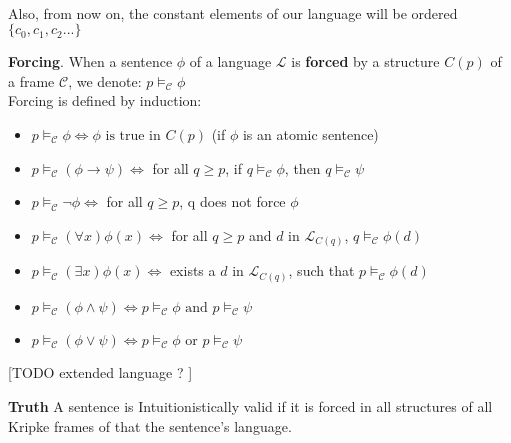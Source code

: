 \documentclass[runningheads]{llncs}
\begin{document}
    \\Also, from now on, the constant elements of our language will be ordered $\{c_0, c_1, c_2 ...\}$


\begin{definition}\textbf{Forcing}.
          When a sentence $\phi$ of a language $\mathcal{L}$ is \textbf{forced} by a structure $C(p)$ of a frame $\mathcal{C}$, we denote:
        $ p \vDash_{\mathcal{C}} \phi$ \\
         Forcing is defined by induction: \cite{book1}

        \begin{itemize}
            \item    $ p \vDash_{\mathcal{C}} \phi                 \Leftrightarrow \phi \text{ is true in } C(p)$ (if $\phi$ is an atomic sentence)\\
            \item    $ p \vDash_{\mathcal{C}} (\phi \to \psi)      \Leftrightarrow$   for all $q \geq p$, if $q \vDash_{\mathcal{C}} \phi$, then $q \vDash_{\mathcal{C}} \psi$
            \item    $ p \vDash_{\mathcal{C}} \neg \phi            \Leftrightarrow $  for all $q \geq p$, q does not force $\phi$\\
            \item    $ p \vDash_{\mathcal{C}} (\forall x) \phi(x)  \Leftrightarrow $  for all $q \geq p$ and $d$ in $\mathcal{L}_{C(q)}$, $q \vDash_{\mathcal{C}} \phi(d)$ \\
            \item    $ p \vDash_{\mathcal{C}} (\exists x) \phi(x)  \Leftrightarrow $  exists a $d$ in  $\mathcal{L}_{C(q)}$, such that $p \vDash_{\mathcal{C}} \phi(d)$\\
            \item    $ p \vDash_{\mathcal{C}} (\phi \land \psi)    \Leftrightarrow p \vDash_{\mathcal{C}} \phi \text{ and } p \vDash_{\mathcal{C}} \psi$ \\
            \item    $ p \vDash_{\mathcal{C}} (\phi \lor \psi)     \Leftrightarrow p \vDash_{\mathcal{C}} \phi$ or $p \vDash_{\mathcal{C}} \psi$ \\

        \end{itemize}
\end{definition}

[TODO extended language ? ] 
\begin{definition}
    \textbf{Truth}
    A sentence is Intuitionistically valid if it is forced in all structures of all Kripke
        frames of that the sentence's language.
\end{definition}
\end{document}
